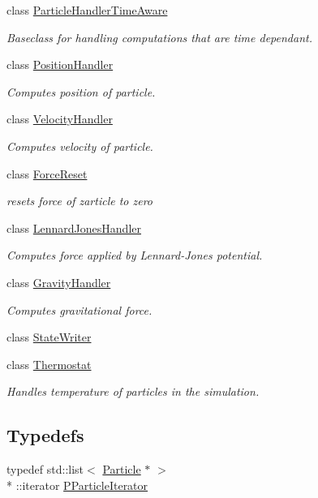 \begin{DoxyCompactItemize}
class \hyperlink{classSimulation_1_1ParticleHandlerTimeAware}{Particle\-Handler\-Time\-Aware}
\begin{DoxyCompactList}\small\item\em Baseclass for handling computations that are time dependant. \end{DoxyCompactList}\item 
class \hyperlink{classSimulation_1_1PositionHandler}{Position\-Handler}
\begin{DoxyCompactList}\small\item\em Computes position of particle. \end{DoxyCompactList}\item 
class \hyperlink{classSimulation_1_1VelocityHandler}{Velocity\-Handler}
\begin{DoxyCompactList}\small\item\em Computes velocity of particle. \end{DoxyCompactList}\item 
class \hyperlink{classSimulation_1_1ForceReset}{Force\-Reset}
\begin{DoxyCompactList}\small\item\em resets force of zarticle to zero \end{DoxyCompactList}\item 
class \hyperlink{classSimulation_1_1LennardJonesHandler}{Lennard\-Jones\-Handler}
\begin{DoxyCompactList}\small\item\em Computes force applied by Lennard-\/\-Jones potential. \end{DoxyCompactList}\item 
class \hyperlink{classSimulation_1_1GravityHandler}{Gravity\-Handler}
\begin{DoxyCompactList}\small\item\em Computes gravitational force. \end{DoxyCompactList}\item 
class \hyperlink{classSimulation_1_1StateWriter}{State\-Writer}
\item 
class \hyperlink{classSimulation_1_1Thermostat}{Thermostat}
\begin{DoxyCompactList}\small\item\em Handles temperature of particles in the simulation. \end{DoxyCompactList}\end{DoxyCompactItemize}
\subsection*{Typedefs}
\begin{DoxyCompactItemize}
\item 
typedef std\-::list$<$ \hyperlink{classSimulation_1_1Particle}{Particle} $\ast$ $>$\\*
\-::iterator \hyperlink{namespaceSimulation_a12159ab8aae83e7edd7a19bc93695340}{P\-Particle\-Iterator}
\end{DoxyCompactItemize}


